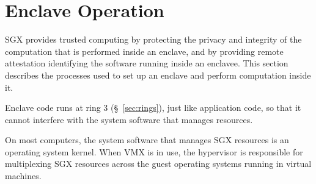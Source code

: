 \section{Enclave Operation}

SGX provides trusted computing by protecting the privacy and integrity of the
computation that is performed inside an enclave, and by providing remote
attestation identifying the software running inside an enclavee. This section
describes the processes used to set up an enclave and perform computation
inside it.


Enclave code runs at ring 3 (\S~\ref{sec:rings}), just like application code,
so that it cannot interfere with the system software that manages resources.


On most computers, the system software that manages SGX resources is an
operating system kernel. When VMX is in use, the hypervisor is responsible for
multiplexing SGX resources across the guest operating systems running in
virtual machines.


